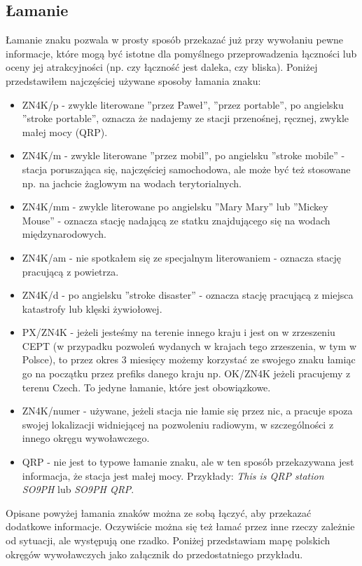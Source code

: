 \documentclass[a4paper,11pt]{article}
\begin{document}
\subsection{Łamanie}
Łamanie znaku pozwala w prosty sposób przekazać już przy wywołaniu pewne informacje, które mogą być istotne dla pomyślnego przeprowadzenia łączności lub oceny jej atrakcyjności (np. czy łączność jest daleka, czy bliska). Poniżej przedstawiłem najczęściej używane sposoby łamania znaku:
\begin{itemize}
\item ZN4K/p - zwykle literowane ''przez Paweł'', ''przez portable'', po angielsku ''stroke portable'', oznacza że nadajemy ze stacji przenośnej, ręcznej, zwykle małej mocy (QRP).
\item ZN4K/m - zwykle literowane ''przez mobil'', po angielsku ''stroke mobile'' - stacja poruszająca się, najczęściej samochodowa, ale może być też stosowane np. na jachcie żaglowym na wodach terytorialnych.
\item ZN4K/mm - zwykle literowane po angielsku ''Mary Mary'' lub ''Mickey Mouse'' - oznacza stację nadającą ze statku znajdującego się na wodach międzynarodowych.
\item ZN4K/am - nie spotkałem się ze specjalnym literowaniem - oznacza stację pracującą z powietrza.
\item ZN4K/d - po angielsku ''stroke disaster'' - oznacza stację pracującą z miejsca katastrofy lub klęski żywiołowej.
\item PX/ZN4K - jeżeli jesteśmy na terenie innego kraju i jest on w zrzeszeniu CEPT (w przypadku pozwoleń wydanych w krajach tego zrzeszenia, w tym w Polsce), to przez okres 3 miesięcy możemy korzystać ze swojego znaku łamiąc go na początku przez prefiks danego kraju np. OK/ZN4K jeżeli pracujemy z terenu Czech. To jedyne łamanie, które jest obowiązkowe.
\item ZN4K/numer - używane, jeżeli stacja nie łamie się przez nic, a pracuje spoza swojej lokalizacji widniejącej na pozwoleniu radiowym, w szczególności z innego okręgu wywoławczego.
\item QRP - nie jest to typowe łamanie znaku, ale w ten sposób przekazywana jest informacja, że stacja jest małej mocy. Przykłady: \textit{This is QRP station SO9PH} lub \textit{SO9PH QRP}.
\end{itemize}
Opisane powyżej łamania znaków można ze sobą łączyć, aby przekazać dodatkowe informacje. Oczywiście można się też łamać przez inne rzeczy zależnie od sytuacji, ale występują one rzadko. Poniżej przedstawiam mapę polskich okręgów wywoławczych jako załącznik do przedostatniego przykładu.
\end{document}
